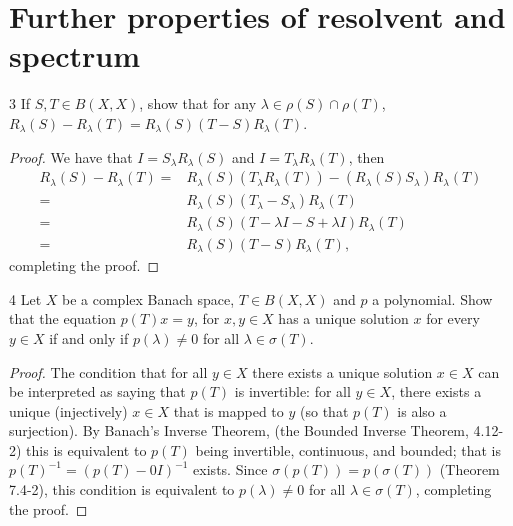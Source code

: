\section{Further properties of resolvent and spectrum}


\begin{exercise}{3}
If $S, T \in B(X, X)$, show that for any $\lambda \in \rho(S) \cap \rho(T)$, $R_\lambda(S) - R_\lambda(T) = R_\lambda(S)(T - S)R_\lambda(T)$.
\end{exercise}
\begin{proof}
We have that $I = S_\lambda R_\lambda(S)$ and $I = T_\lambda R_\lambda(T)$, then
\begin{align*}
    R_\lambda(S) - R_\lambda(T)
    =& R_\lambda(S) (T_\lambda R_\lambda(T)) - (R_\lambda(S) S_\lambda) R_\lambda(T)\\
    =& R_\lambda(S) (T_\lambda - S_\lambda) R_\lambda(T)\\
    =& R_\lambda(S) (T - \lambda I - S + \lambda I) R_\lambda(T)\\
    =& R_\lambda(S) (T - S) R_\lambda(T),
\end{align*}
completing the proof.
\end{proof} 

\begin{exercise}{4}
Let $X$ be a complex Banach space, $T \in B(X, X)$ and $p$ a polynomial.
Show that the equation $p(T)x = y$, for $x, y \in X$ has a unique solution $x$ for every $y \in X$ if and only if $p(\lambda) \neq 0$ for all $\lambda \in \sigma(T)$.
\end{exercise}
\begin{proof}
The condition that for all $y \in X$ there exists a unique solution $x \in X$ can be interpreted as saying that $p(T)$ is invertible: for all $y \in X$, there exists a unique (injectively) $x \in X$ that is mapped to $y$ (so that $p(T)$ is also a surjection).
By Banach's Inverse Theorem, (the Bounded Inverse Theorem, 4.12-2) this is equivalent to $p(T)$ being invertible, continuous, and bounded;
that is $p(T)^{-1} = (p(T) - 0I)^{-1}$ exists.
Since $\sigma(p(T)) = p(\sigma(T))$ (Theorem 7.4-2), this condition is equivalent to $p(\lambda) \neq 0$ for all $\lambda \in \sigma(T)$, completing the proof.
\end{proof} 

